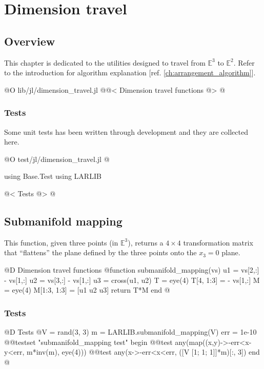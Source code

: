 
\chapter{Dimension travel}
\label{ch:dimension_travel}

\section{Overview}

This chapter is dedicated to
the utilities designed to travel
from $\mathbb{E}^3$ to $\mathbb{E}^2$.
Refer to the introduction for algorithm explanation
[ref. \ref{ch:arrangement_algorithm}].

@O lib/jl/dimension_travel.jl
@{@< Dimension travel functions @>
@}
\subsection{Tests}

Some unit tests has been written through development and
they are collected here.

@O test/jl/dimension_travel.jl
@{using Base.Test
using LARLIB

@< Tests @>
@}


\section{Submanifold mapping}
\label{sec:submanifold_mapping}

This function, given three points (in $\mathbb{E}^3$), 
returns a $4\times4$ transformation matrix that ``flattens''
the plane defined by the three points onto the $x_3=0$ plane.

@D Dimension travel functions
@{function submanifold_mapping(vs)
    u1 = vs[2,:] - vs[1,:]
    u2 = vs[3,:] - vs[1,:]
    u3 = cross(u1, u2)
    T = eye(4)
    T[4, 1:3] = - vs[1,:]
    M = eye(4)
    M[1:3, 1:3] = [u1 u2 u3]
    return T*M
end
@}
\subsection{Tests}

@D Tests
@{V = rand(3, 3)
m = LARLIB.submanifold_mapping(V)
err = 1e-10 
@@testset "submanifold_mapping test" begin
    @@test any(map((x,y)->-err<x-y<err, m*inv(m), eye(4)))
    @@test any(x->-err<x<err, ([V [1; 1; 1]]*m)[:, 3])
end
@}





